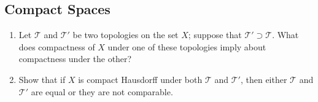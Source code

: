 \subsection{Compact Spaces}

\begin{exercise}[ID=3.26.1]
  \begin{enumerate}[label={(\alph*)}, align=left, leftmargin=\parindent, listparindent=\parindent, labelwidth=0pt, itemindent=!]
    \item
          Let $\mathcal{T}$ and $\mathcal{T}'$ be two topologies on the set $X$;
          suppose that $\mathcal{T}' \supset \mathcal{T}$.
          What does compactness of $X$ under one of these topologies imply about compactness under the other?
    \item
          Show that if $X$ is compact Hausdorff under both $\mathcal{T}$ and $\mathcal{T}'$, then either $\mathcal{T}$ and $\mathcal{T}'$ are equal or they are not comparable.
  \end{enumerate}
\end{exercise}
%
